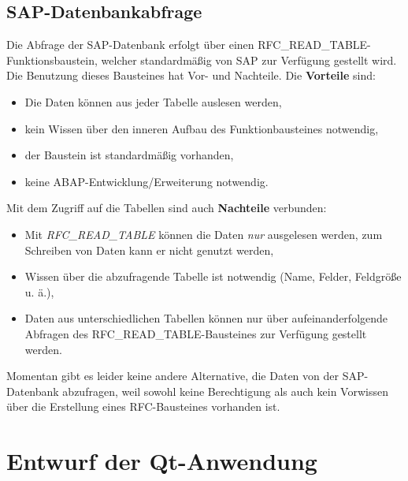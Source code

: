 \subsection{SAP-Datenbankabfrage} \label{SAPAbfrage}
Die Abfrage der SAP-Datenbank erfolgt über einen RFC\_READ\_TABLE-Funktionsbaustein, welcher standardmäßig von SAP zur Verfügung gestellt wird. Die Benutzung dieses Bausteines hat Vor- und Nachteile. Die \textbf{Vorteile} sind:
\begin{itemize}
	\setlength{\itemsep}{-10pt}
	\item Die Daten können aus jeder Tabelle auslesen werden,
	\item kein Wissen über den inneren Aufbau des Funktionbausteines notwendig,
	\item der Baustein ist standardmäßig vorhanden,
	\item keine ABAP-Entwicklung/Erweiterung notwendig.
\end{itemize}
Mit dem Zugriff auf die Tabellen sind auch \textbf{Nachteile} verbunden:
\begin{itemize}
	\setlength{\itemsep}{-10pt}
	\item Mit \textit{RFC\_READ\_TABLE} können die Daten \textit{nur} ausgelesen werden, zum Schreiben von Daten kann er nicht genutzt werden,
	\item Wissen über die abzufragende Tabelle ist notwendig (Name, Felder, Feldgröße u. ä.),
	\item Daten aus unterschiedlichen Tabellen können nur über aufeinanderfolgende Abfragen des RFC\_READ\_TABLE-Bausteines zur Verfügung gestellt werden.
\end{itemize}
Momentan gibt es leider keine andere Alternative, die Daten von der SAP-Datenbank abzufragen, weil sowohl keine Berechtigung als auch kein Vorwissen über die Erstellung eines RFC-Bausteines vorhanden ist.

\section{Entwurf der Qt-Anwendung}
